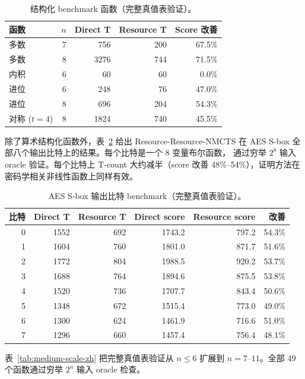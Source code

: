 \documentclass[UTF8,fontset=fandol,11pt]{ctexart}
\newcommand{\method}{Resource-NMCTS}
\begin{document}
\begin{table}[H]
\centering\small
\caption{结构化 benchmark 函数（完整真值表验证）。}
\label{tab:structured-benchmark-zh}
\begin{tabular}{lrrrr}\toprule
函数 & $n$ & Direct T & Resource T & Score 改善 \\ \midrule
多数 & 7 & 756 & 200 & 67.5\% \\
多数 & 8 & 3276 & 744 & 71.5\% \\
内积 & 6 & 60 & 60 & 0.0\% \\
进位 & 6 & 248 & 76 & 47.0\% \\
进位 & 8 & 696 & 204 & 54.3\% \\
对称 ($t{=}4$) & 8 & 1824 & 740 & 45.5\% \\ \bottomrule
\end{tabular}\end{table}

除了算术结构化函数外，表~\ref{tab:aes-sbox-zh} 给出 Resource-\method{}
在 AES S-box 全部八个输出比特上的结果。每个比特是一个 8 变量布尔函数，
通过穷举 $2^8$ 输入 oracle 验证。每个比特上 T-count 大约减半（score 改善
48\%--54\%），证明方法在密码学相关非线性函数上同样有效。

\begin{table}[H]
\centering\small
\caption{AES S-box 输出比特 benchmark（完整真值表验证）。}
\label{tab:aes-sbox-zh}
\begin{tabular}{rrrrrr}
\toprule
比特 & Direct T & Resource T & Direct score & Resource score & 改善 \\
\midrule
0 & 1552 & 692 & 1743.2 & 797.2 & 54.3\% \\
1 & 1604 & 760 & 1801.0 & 871.7 & 51.6\% \\
2 & 1772 & 804 & 1988.5 & 920.2 & 53.7\% \\
3 & 1688 & 764 & 1894.6 & 875.5 & 53.8\% \\
4 & 1520 & 736 & 1707.7 & 843.4 & 50.6\% \\
5 & 1348 & 672 & 1515.4 & 773.0 & 49.0\% \\
6 & 1300 & 624 & 1461.9 & 716.6 & 51.0\% \\
7 & 1296 & 660 & 1457.4 & 756.4 & 48.1\% \\
\bottomrule
\end{tabular}
\end{table}

表~\ref{tab:medium-scale-zh} 把完整真值表验证从 $n\leq6$ 扩展到
$n=7$--$11$。全部 49 个函数通过穷举 $2^n$ 输入 oracle 检查。
\end{document}
